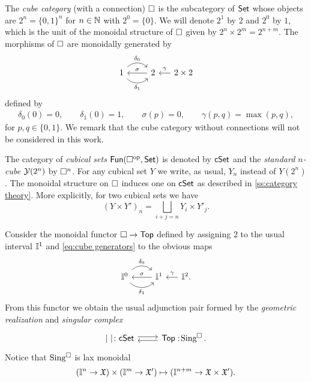 The \textit{cube category} (with a connection) $\square$ is the subcategory of $\mathsf{Set}$ whose objects are $2^n = \{0, 1\}^n$ for $n \in \mathbb{N}$ with $2^0 = \{0\}$.
We will denote $2^1$ by $2$ and $2^0$ by $1$, which is the unit of the monoidal structure of $\square$ given by $2^n \times 2^m = 2^{n+m}$.
The morphisms of $\square$ are monoidally generated by
\begin{equation}\label{eq:cube generators}
	\begin{tikzcd}
		1 \arrow[r, out=45, in=135, "\delta_0"] \arrow[r, out=-45, in=-135, "\delta_1"'] & 2 \arrow[l, "\sigma"'] &[-10pt] \arrow[l, "\gamma"'] 2 \times 2
	\end{tikzcd}
\end{equation}
defined by
\begin{gather*}
	\delta_0(0) = 0, \qquad
	\delta_1(0) = 1, \qquad
	\sigma(p) = 0, \qquad
	\gamma(p,q) = \max(p,q),
\end{gather*}
for $p,q \in \{0,1\}$.
We remark that the cube category without connections will not be considered in this work.

The category of \textit{cubical sets} $\mathsf{Fun}(\square^{\mathrm{op}}, \mathsf{Set})$ is denoted by $\mathsf{cSet}$ and
the \textit{standard $n$-cube} $\operatorname{\mathcal{Y}}(2^n)$ by $\square^n$.
For any cubical set $Y$ we write, as usual, $Y_n$ instead of $Y(2^n)$.
The monoidal structure on $\square$ induces one on $\mathsf{cSet}$ as described in \cref{ss:category theory}.
More explicitly, for two cubical sets we have
\[
(Y \times Y')_n = \bigsqcup_{i+j=n} Y_i \times Y'_j.
\]

Consider the monoidal functor $\square \to \mathsf{Top}$ defined by assigning $2$ to the usual interval $\mathbb{I}^1$ and \eqref{eq:cube generators} to the obvious maps
\[
\begin{tikzcd}
	\gcube^0 \arrow[r, out=45, in=135, "\delta_0"] \arrow[r, out=-45, in=-135, "\delta_1"'] & \gcube^1 \arrow[l, "\sigma"'] &[-10pt] \arrow[l, "\gamma"'] \gcube^2.
\end{tikzcd}
\]
From this functor we obtain the usual adjunction pair formed by the \textit{geometric realization} and \textit{singular complex}
\[
\begin{tikzcd}
	\bars{\ } \colon \cSet \arrow[r, shift left=.5ex] &
	\Top :\! \cSing. \arrow[l, shift left=.5ex]
\end{tikzcd}
\]
Notice that $\operatorname{Sing^{\square}}$ is lax monoidal
\[
(\mathbb{I}^n \to \mathfrak{X}) \times (\mathbb{I}^m \to \mathfrak{X}') \mapsto (\mathbb{I}^{n+m} \to \mathfrak{X} \times \mathfrak{X}').
\]


